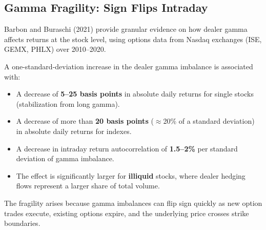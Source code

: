 \subsection{Gamma Fragility: Sign Flips Intraday}

Barbon and Buraschi (2021) provide granular evidence on how dealer
gamma affects returns at the stock level, using options data from
Nasdaq exchanges (ISE, GEMX, PHLX) over 2010--2020.

\begin{keyresult}
A one-standard-deviation increase in the dealer gamma imbalance is
associated with:
\begin{itemize}[nosep]
  \item A decrease of \textbf{5--25 basis points} in absolute daily
        returns for single stocks (stabilization from long gamma).
  \item A decrease of more than \textbf{20 basis points}
        ($\approx$20\% of a standard deviation) in absolute daily
        returns for indexes.
  \item A decrease in intraday return autocorrelation of
        \textbf{1.5--2\%} per standard deviation of gamma imbalance.
  \item The effect is significantly larger for \textbf{illiquid}
        stocks, where dealer hedging flows represent a larger share
        of total volume.
\end{itemize}
The fragility arises because gamma imbalances can flip sign quickly
as new option trades execute, existing options expire, and the
underlying price crosses strike boundaries.
\end{keyresult}

